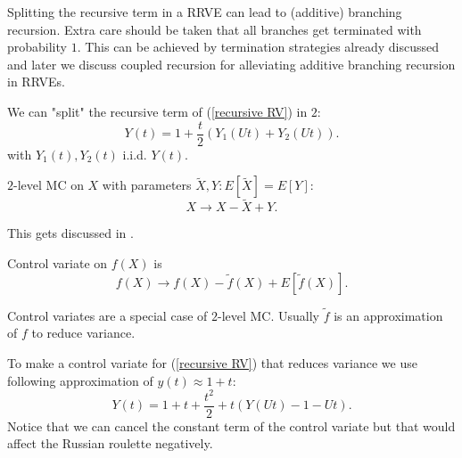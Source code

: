 \documentclass[a4paper,12pt]{article}
\begin{document}
Splitting the recursive term in a RRVE can lead to (additive) branching recursion.
Extra care should be taken that all branches get terminated with probability $1$. This can be
achieved by termination strategies already discussed and later we discuss coupled recursion for
alleviating additive branching recursion in RRVEs.

\begin{example}
    We can "split" the recursive term of  (\ref{recursive RV}) in $2$:
    \[
        Y(t) = 1 + \frac{t}{2}(Y_{1}(Ut)+Y_{2}(Ut))
        .\]
    with $Y_{1}(t),Y_{2}(t)$ i.i.d. $Y(t)$.
\end{example}

\vspace{0.2cm}

\begin{python}
\end{python}

\begin{definition}[$2$-level MC] \label{2 level}
    $2$-level MC on $X$ with parameters $\tilde{X}, Y: E[\tilde{X}]=E[Y]$:
    \[
        X \rightarrow X-\tilde{X} + Y
        .\]
\end{definition}

This gets discussed in \cite{giles_multilevel_2013}.

\begin{definition} \label{CV}
    Control variate on $f(X)$ is
    \[
        f(X) \rightarrow f(X)-\tilde{f}(X) + E[\tilde{f}(X)]
        .\]
\end{definition}
Control variates are a special case of $2$-level MC. Usually $\tilde{f}$ is an approximation
of $f$ to reduce variance.

\begin{example}
    To make a control variate for (\ref{recursive RV}) that reduces variance
    we use following approximation of $y(t) \approx 1+t$:
    \[
        Y(t)= 1+t+\frac{t^{2}}{2} + t(Y(Ut)-1-Ut)
        .\]
    Notice that we can cancel the constant term of the control variate
    but that would affect the Russian roulette negatively.
\end{example}

\begin{python}
\end{python}
\end{document}
